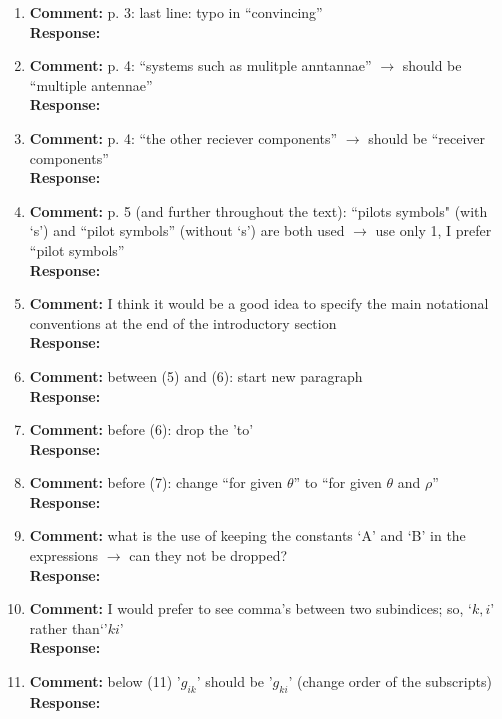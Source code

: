 \documentclass{article}
\begin{document}
\begin{enumerate}
\item \textbf{Comment:} p. 3: last line: typo in ``convincing'' \\
\textbf{Response:}

\item \textbf{Comment:} p. 4: ``systems such as mulitple anntannae'' $\to$ should be ``multiple antennae'' \\
\textbf{Response:}

\item \textbf{Comment:} p. 4: ``the other reciever components'' $\to$ should be ``receiver components'' \\
\textbf{Response:}

\item \textbf{Comment:} p. 5 (and further throughout the text): ``pilots symbols" (with `s') and ``pilot symbols'' (without `s') are both used $\to$ use only 1, I prefer ``pilot symbols'' \\
\textbf{Response:}

\item \textbf{Comment:} I think it would be a good idea to specify the main notational conventions at the end of the introductory section \\
\textbf{Response:}

\item \textbf{Comment:} between (5) and (6): start new paragraph \\
\textbf{Response:}

\item \textbf{Comment:} before (6): drop the 'to' \\
\textbf{Response:}

\item \textbf{Comment:} before (7): change ``for given $\theta$'' to ``for given $\theta$ and $\rho$'' \\
\textbf{Response:}

\item \textbf{Comment:} what is the use of keeping the constants `A' and `B' in the expressions $\to$ can they not be dropped? \\
\textbf{Response:}

\item \textbf{Comment:} I would prefer to see comma's between two subindices; so, `$k,i$' rather than`'$ki$' \\
\textbf{Response:}

\item \textbf{Comment:} below (11) '$g_{ik}$' should be '$g_{ki}$' (change order of the subscripts) \\
\textbf{Response:}


\end{enumerate}
\end{document}

